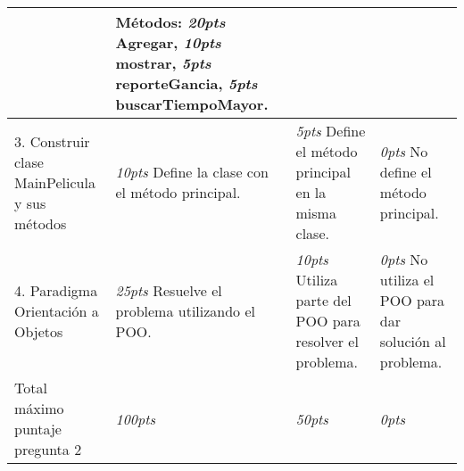 \documentclass[10pt]{article}
\begin{document}
\begin{table}[!ht]
{\begin{center}
\begin{tabular}{|p{3.5cm}|p{3.5cm}|p{3.5cm}|p{3.5cm}|}
                & M\'etodos: \emph{20pts} Agregar, \emph{10pts} mostrar, \emph{5pts} reporteGancia, \emph{5pts} buscarTiempoMayor.  & & \\ \hline
                3. Construir clase MainPelicula y sus m\'etodos &
                \emph{10pts} Define la clase con el m\'etodo principal. &
                \emph{  5pts} Define el m\'etodo principal en la misma clase. &
                \emph{  0pts} No define el m\'etodo principal. \\ \hline
                4. Paradigma Orientaci\'on a Objetos  &
                \emph{25pts} Resuelve el problema utilizando el POO. &
                \emph{10pts} Utiliza parte del POO para resolver el problema. &
                \emph{  0pts} No utiliza el POO para dar soluci\'on al problema.\\ \hline
                Total m\'aximo puntaje pregunta 2 &
                \emph{100pts} &
                \emph{50pts} &
                \emph{  0pts} \\ \hline
            \end{tabular}
        \end{center}}
     \end{table}
\end{document}
